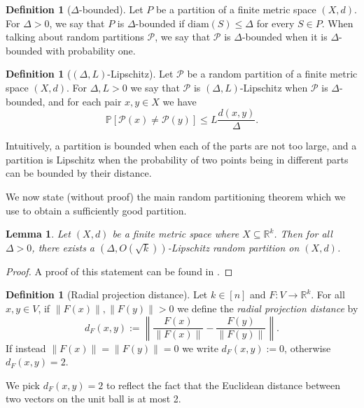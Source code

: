 \documentclass[a4paper,11pt]{article}
\newtheorem{lemma}[theorem]{Lemma}
\theoremstyle{definition}
\newtheorem{definition}[theorem]{Definition}
\newcommand{\R}{\mathbb{R}}
\newcommand{\diam}[1]{\mathrm{diam}\left(#1\right)}
\newcommand{\prob}[1]{\mathbb{P}\left[#1\right]}
\begin{document}
\begin{definition}[$\Delta$-bounded]
Let $P$ be a partition of a finite metric space $(X, d)$. For $\Delta > 0$, we say that $P$ is $\Delta$-bounded if $\diam{S} \le \Delta$ for every $S \in P$. When talking about random partitions $\mathcal{P}$, we say that $\mathcal{P}$ is $\Delta$-bounded when it is $\Delta$-bounded with probability one.
\end{definition}

\begin{definition}[$(\Delta, L)$-Lipschitz]
Let $\mathcal{P}$ be a random partition of a finite metric space $(X, d)$. For $\Delta, L > 0$ we say that $\mathcal{P}$ is $(\Delta, L)$-Lipschitz when $\mathcal{P}$ is $\Delta$-bounded, and for each pair $x, y \in X$ we have
\[
\prob{\mathcal{P}(x) \ne \mathcal{P}(y)} \le L \frac{d(x, y)}{\Delta}.
\]
\end{definition}

Intuitively, a partition is bounded when each of the parts are not too large, and a partition is Lipschitz when the probability of two points being in different parts can be bounded by their distance.

\medskip

We now state (without proof) the main random partitioning theorem which we use to obtain a sufficiently good partition.

\begin{lemma}\label{random-partitioning-thm}
Let $(X, d)$ be a finite metric space where $X \subseteq \R^k$. Then for all $\Delta > 0$, there exists a $(\Delta, O(\sqrt{k}))$-Lipschitz random partition on $(X, d)$.
\end{lemma}
\begin{proof} A proof of this statement can be found in \cite{random-partitioning}. \end{proof}

\begin{definition}[Radial projection distance]
Let $k \in [n]$ and $F: V \to \R^k$. For all $x, y \in V$, if $\|F(x)\|, \|F(y)\| > 0$ we define the \emph{radial projection distance} by
\[d_F(x, y) := \left\|\frac{F(x)}{\|F(x)\|} - \frac{F(y)}{\|F(y)\|}\right\|.\]
If instead $\|F(x)\| = \|F(y)\| = 0$ we write $d_F(x, y) := 0$, otherwise $d_F(x, y) = 2$.
\end{definition}

We pick $d_F(x, y) = 2$ to reflect the fact that the Euclidean distance between two vectors on the unit ball is at most 2.
\end{document}
